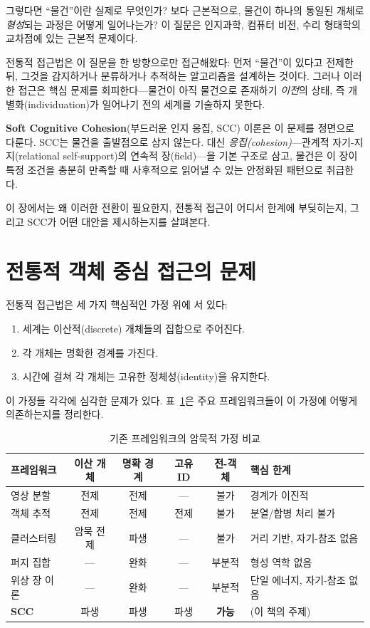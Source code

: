 그렇다면 ``물건''이란 실제로 무엇인가? 보다 근본적으로, 물건이 하나의 통일된 개체로 \emph{형성}되는 과정은 어떻게 일어나는가? 이 질문은 인지과학, 컴퓨터 비전, 수리 형태학의 교차점에 있는 근본적 문제이다.

전통적 접근법은 이 질문을 한 방향으로만 접근해왔다: 먼저 ``물건''이 있다고 전제한 뒤, 그것을 감지하거나 분류하거나 추적하는 알고리즘을 설계하는 것이다. 그러나 이러한 접근은 핵심 문제를 회피한다---물건이 아직 물건으로 존재하기 \emph{이전}의 상태, 즉 개별화(individuation)가 일어나기 전의 세계를 기술하지 못한다.

\textbf{Soft Cognitive Cohesion}(부드러운 인지 응집, SCC) 이론은 이 문제를 정면으로 다룬다. SCC는 물건을 출발점으로 삼지 않는다. 대신 \emph{응집(cohesion)}---관계적 자기-지지(relational self-support)의 연속적 장(field)---을 기본 구조로 삼고, 물건은 이 장이 특정 조건을 충분히 만족할 때 사후적으로 읽어낼 수 있는 안정화된 패턴으로 취급한다.

이 장에서는 왜 이러한 전환이 필요한지, 전통적 접근이 어디서 한계에 부딪히는지, 그리고 SCC가 어떤 대안을 제시하는지를 살펴본다.


\section{전통적 객체 중심 접근의 문제}
\label{sec:traditional-limits}

전통적 접근법은 세 가지 핵심적인 가정 위에 서 있다:
\begin{enumerate}
    \item 세계는 이산적(discrete) 개체들의 집합으로 주어진다.
    \item 각 개체는 명확한 경계를 가진다.
    \item 시간에 걸쳐 각 개체는 고유한 정체성(identity)을 유지한다.
\end{enumerate}

이 가정들 각각에 심각한 문제가 있다. 표~\ref{tab:framework-comparison}은 주요 프레임워크들이 이 가정에 어떻게 의존하는지를 정리한다.

\begin{table}[t]
\centering
\caption{기존 프레임워크의 암묵적 가정 비교}
\label{tab:framework-comparison}
\begin{tabular}{p{2.8cm}ccccp{3cm}}
\hline
\textbf{프레임워크} & \textbf{이산 개체} & \textbf{명확 경계} & \textbf{고유 ID} & \textbf{전-객체} & \textbf{핵심 한계} \\
\hline
영상 분할 & 전제 & 전제 & --- & 불가 & 경계가 이진적 \\
객체 추적 & 전제 & 전제 & 전제 & 불가 & 분열/합병 처리 불가 \\
클러스터링 & 암묵 전제 & 파생 & --- & 불가 & 거리 기반, 자기-참조 없음 \\
퍼지 집합 & --- & 완화 & --- & 부분적 & 형성 역학 없음 \\
위상 장 이론 & --- & 완화 & --- & 부분적 & 단일 에너지, 자기-참조 없음 \\
\hline
\textbf{SCC} & 파생 & 파생 & 파생 & \textbf{가능} & (이 책의 주제) \\
\hline
\end{tabular}
\end{table}



